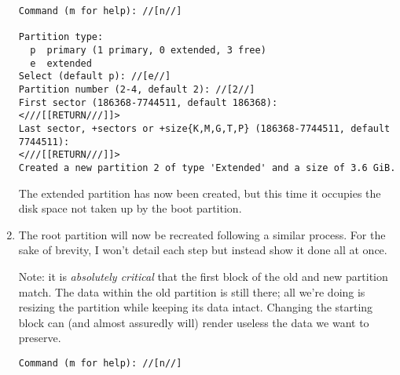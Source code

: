 \documentclass[12pt,letterpaper]{article}
\newcommand\kbd[1]{\textlangle\texttt{#1}\textrangle}
\newcommand\return{RETURN}
\begin{document}
\begin{enumerate}
\begin{lstlisting}
Command (m for help): //[n//]

Partition type:
  p  primary (1 primary, 0 extended, 3 free)
  e  extended
Select (default p): //[e//]
Partition number (2-4, default 2): //[2//]
First sector (186368-7744511, default 186368):
<///[[RETURN///]]>
Last sector, +sectors or +size{K,M,G,T,P} (186368-7744511, default 7744511):
<///[[RETURN///]]>
Created a new partition 2 of type 'Extended' and a size of 3.6 GiB.
\end{lstlisting}

The extended partition has now been created, but this time it occupies the disk space not taken up by the boot partition.
%
%

\item \label{item:root} The root partition will now be recreated following a similar process.  For the sake of brevity, I won't detail each step but instead show it done all at once.

Note: it is \emph{absolutely critical} that the first block of the old and new partition match.  The data within the old partition is still there; all we're doing is resizing the partition while keeping its data intact.  Changing the starting block can (and almost assuredly will) render useless the data we want to preserve.
\begin{lstlisting}
Command (m for help): //[n//]


\end{lstlisting}
\end{enumerate}
\end{document}
